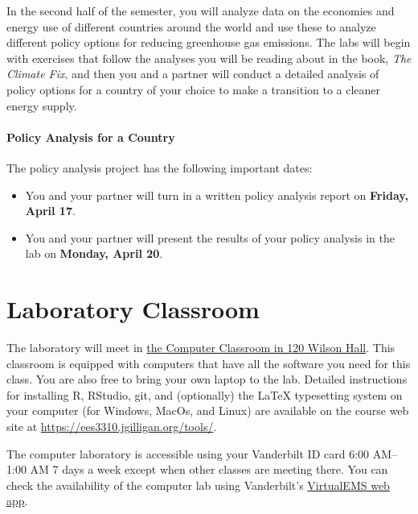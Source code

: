 \documentclass[
]{article}
\providecommand{\tightlist}{%
  \setlength{\itemsep}{0pt}\setlength{\parskip}{0pt}}
\begin{document}
In the second half of the semester, you will analyze data on the
economies and energy use of different countries around the world and use
these to analyze different policy options for reducing greenhouse gas
emissions. The labs will begin with exercises that follow the analyses
you will be reading about in the book, \emph{The Climate Fix}, and then
you and a partner will conduct a detailed analysis of policy options for
a country of your choice to make a transition to a cleaner energy
supply.

\hypertarget{policy-analysis-for-a-country}{%
\paragraph{Policy Analysis for a
Country}\label{policy-analysis-for-a-country}}

The policy analysis project has the following important dates:

\begin{itemize}
\tightlist
\item
  You and your partner will turn in a written policy analysis report on
  \textbf{Friday, April 17}.
\item
  You and your partner will present the results of your policy analysis
  in the lab on \textbf{Monday, April 20}.
\end{itemize}

\hypertarget{laboratory-classroom}{%
\section{Laboratory Classroom}\label{laboratory-classroom}}

The laboratory will meet in
\href{https://as.vanderbilt.edu/vuit/computer_services/facilities/Wilson.php}{the
Computer Classroom in 120 Wilson Hall}. This classroom is equipped with
computers that have all the software you need for this class. You are
also free to bring your own laptop to the lab. Detailed instructions for
installing R, RStudio, git, and (optionally) the LaTeX typesetting
system on your computer (for Windows, MacOs, and Linux) are available on
the course web site at \url{https://ees3310.jgilligan.org/tools/}.

The computer laboratory is accessible using your Vanderbilt ID card 6:00
AM--1:00 AM 7 days a week except when other classes are meeting there.
You can check the availability of the computer lab using Vanderbilt's
\href{https://emscampus.app.vanderbilt.edu/VirtualEms/LocationDetails.aspx?data=XHoo9AMVGMQbSraiXQjvGUDuKA574KqHNLkvgXI29xak6HZ4Mu3JOk0wo\%2fFGuBk+\#room-availability}{VirtualEMS
web app}.
\end{document}
